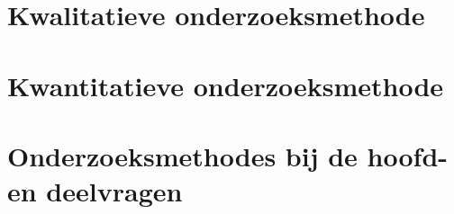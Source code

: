 \styledchapter[Onderzoeksmethodes]

\section{Kwalitatieve onderzoeksmethode}

\section{Kwantitatieve onderzoeksmethode}

\section{Onderzoeksmethodes bij de hoofd- en deelvragen}